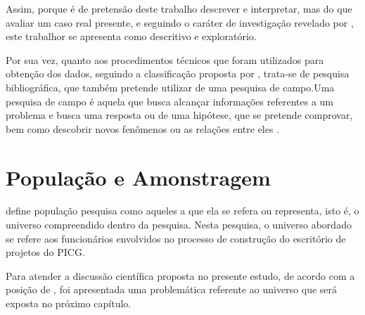 Assim, porque é de pretensão deste trabalho descrever e interpretar, mas do que avaliar um caso real presente, e seguindo o caráter de investigação revelado por , este trabalhor se apresenta como descritivo e exploratório.

Por sua vez, quanto aos procedimentos técnicos que foram utilizados para obtenção dos dados, seguindo a classificação proposta por , trata-se de pesquisa bibliográfica, que também pretende utilizar de uma pesquisa de campo.Uma pesquisa de campo é aquela que busca alcançar informações referentes a um problema e busca uma resposta ou de uma hipótese, que se pretende comprovar, bem como descobrir novos fenômenos ou as relações entre eles \cite{de2007metodologia}.


\section{População e Amonstragem}

 define população pesquisa como aqueles a que ela se refera ou representa, isto é, o universo compreendido dentro da pesquisa. Nesta pesquisa, o universo abordado se refere aos funcionários envolvidos no processo de construção do escritório de projetos do PICG.

Para atender a discussão científica proposta no presente estudo, de acordo com a posição de , foi apresentada uma problemática referente ao universo que será exposta no próximo capítulo.


